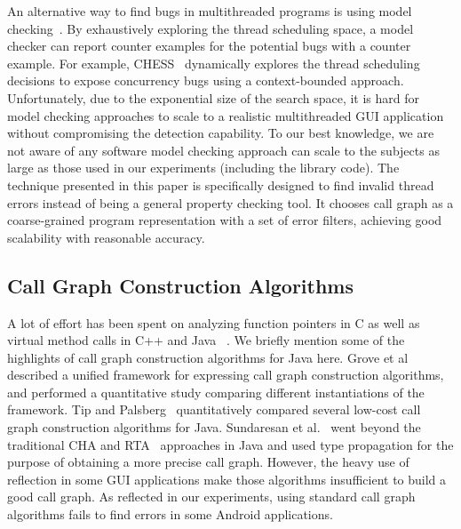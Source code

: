 An alternative way to find bugs in multithreaded programs is using model checking~\cite{Nori:2010:ESO, Inverardi:2000, Siegel:2008}.
By exhaustively exploring the thread scheduling space, a model checker can
report counter examples for the potential bugs with a counter example. For example,
CHESS~\cite{chess} dynamically explores the thread scheduling decisions to expose
concurrency bugs using a context-bounded approach. 
Unfortunately, due to the exponential size of the search space,
 it is hard for model checking approaches to scale to a realistic multithreaded GUI application
 without compromising the detection capability. To our best knowledge,
we are not aware of any software model checking approach can scale to the subjects
as large as those used in our experiments (including the library code).
The technique presented in this paper is specifically designed to find invalid thread
errors instead of being a general property checking tool. 
It chooses call graph as a coarse-grained program representation with a
set of error filters, achieving good scalability with reasonable accuracy.


\subsection{Call Graph Construction Algorithms}

A lot of effort has been spent on analyzing function pointers in C
as well as virtual method calls in C++ and Java ~\cite{rta, kcfa,
xta, inccg, Sundaresan:2000}.
We briefly mention some of the highlights of call graph construction
algorithms for Java here. Grove et al~\cite{kcfa} described a unified
framework for expressing call graph construction algorithms, and
performed a quantitative study comparing different instantiations
of the framework. Tip and Palsberg~\cite{xta} quantitatively compared
several low-cost call graph construction algorithms for Java.
Sundaresan et al.~\cite{Sundaresan:2000} went beyond the traditional
CHA and RTA~\cite{rta} approaches in Java and used type propagation
for the purpose of obtaining a more precise call graph.
However, the heavy use of reflection in some GUI applications make
those algorithms insufficient to build a good call graph.
As reflected in our experiments, using standard call graph algorithms
fails to find errors in some
Android applications. %


